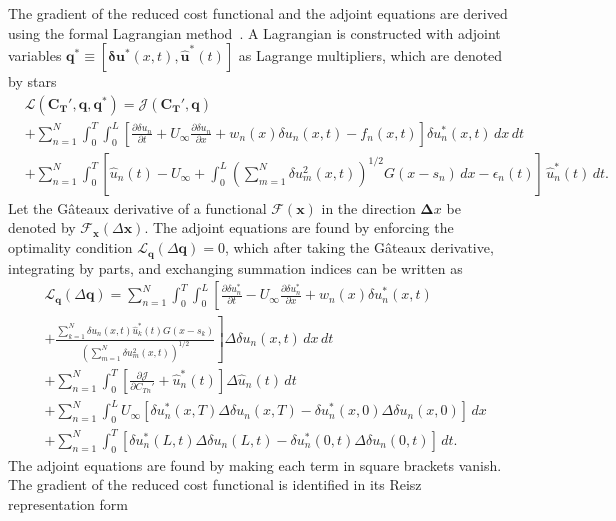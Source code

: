 The gradient of the reduced cost functional and the adjoint equations are derived using the formal Lagrangian method~\cite{Goit2015a, Borzi2011a}. A Lagrangian is constructed with adjoint variables $\mathbf{q^*} \equiv [\boldsymbol \delta \mathbf{u}^*(x,t), \mathbf{\hat{u}^*}(t)]$ as Lagrange multipliers, which are denoted by stars
\begin{align}
&\mathcal{L}(\mathbf{C_T'}, \mathbf{q}, \mathbf{q^*}) = \mathcal{J}(\mathbf{C_T'},\mathbf{q}) \\
&+ \sum_{n=1}^N \int_0^T \int_0^L \left[   \frac{\partial \delta u_n}{\partial t} + U_\infty \frac{\partial \delta u_n}{\partial x} + w_n(x) \delta u_n(x,t) - f_n(x,t)   \right] \delta u_n^*(x,t) \, dx \, dt    \nonumber\\
&+ \sum_{n=1}^N \int_0^T\left[\hat{u}_n (t) - U_\infty + \int_0^L  \left(\sum_{m=1}^N \delta u_m^2(x,t)\right)^{1/2}G(x - s_n) \, dx - \epsilon_n(t) \right]  \, \hat{u}_n^*(t) \, dt. \nonumber
\end{align}
Let the G\^{a}teaux derivative of a functional $\mathcal{F}(\mathbf{x})$ in the direction $\boldsymbol \Delta x$ be denoted by $\mathcal{F}_\mathbf{x}(\Delta \mathbf{x})$. The adjoint equations are found by enforcing the optimality condition $\mathcal{L}_\mathbf{q}(\Delta \mathbf{q}) = 0$, which after taking the G\^{a}teaux derivative, integrating by parts, and exchanging summation indices can be written as
\begingroup
\allowdisplaybreaks
\begin{align}
& \mathcal{L}_\mathbf{q}(\Delta \mathbf{q})  = \sum_{n=1}^N \int_0^T \int_0^L \left[   \frac{\partial \delta u_n^*}{\partial t} - U_\infty \frac{\partial \delta u_n^*}{\partial x} + w_n(x) \delta u_n^*(x,t) \right.   \nonumber \\
&+ \left. \frac{\sum_{k=1}^N\delta u_n(x,t) \hat{u}_k^*(t) G(x - s_k)  }{\left(\sum_{m=1}^N \delta u_m^2(x,t)\right)^{1/2}}\right] \Delta \delta u_n(x,t) \, dx \, dt  \nonumber\\
&+  \sum_{n=1}^N \int_0^T \left[\frac{\partial \mathcal{J}}{\partial C_{Tn}'} + \hat{u}_n^*(t) \right] \Delta \hat{u}_n(t) \, dt \\
&+ \sum_{n=1}^N \int_0^L U_\infty \left[ \delta u_n^*(x,T) \Delta  \delta u_n(x,T) - \delta u_n^*(x,0) \Delta  \delta u_n(x,0) \right] \, dx \nonumber \\
&+ \sum_{n=1}^N \int_0^T \left[ \delta u_n^*(L,t) \Delta  \delta u_n(L,t) - \delta u_n^*(0,t) \Delta  \delta u_n(0,t) \right] \, dt.  \nonumber
\end{align}
\endgroup
The adjoint equations are found by making each term in square brackets vanish. The gradient of the reduced cost functional is identified in its Reisz representation form
